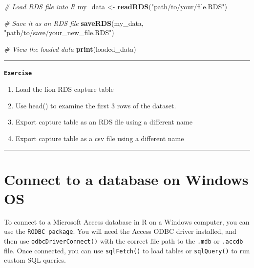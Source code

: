\documentclass[
]{book}
\newenvironment{Shaded}{\begin{snugshade}}{\end{snugshade}}
\newcommand{\CommentTok}[1]{\textcolor[rgb]{0.56,0.35,0.01}{\textit{#1}}}
\newcommand{\FunctionTok}[1]{\textcolor[rgb]{0.13,0.29,0.53}{\textbf{#1}}}
\newcommand{\NormalTok}[1]{#1}
\newcommand{\OtherTok}[1]{\textcolor[rgb]{0.56,0.35,0.01}{#1}}
\newcommand{\StringTok}[1]{\textcolor[rgb]{0.31,0.60,0.02}{#1}}
\providecommand{\tightlist}{%
  \setlength{\itemsep}{0pt}\setlength{\parskip}{0pt}}
\begin{document}
\begin{Shaded}
\begin{Highlighting}[]
\CommentTok{\# Load RDS file into R}
\NormalTok{my\_data }\OtherTok{\textless{}{-}} \FunctionTok{readRDS}\NormalTok{(}\StringTok{"path/to/your/file.RDS"}\NormalTok{)}

\CommentTok{\# Save it as an RDS file}
\FunctionTok{saveRDS}\NormalTok{(my\_data, }\StringTok{"path/to/save/your\_new\_file.RDS"}\NormalTok{)}

\CommentTok{\# View the loaded data}
\FunctionTok{print}\NormalTok{(loaded\_data)}
\end{Highlighting}
\end{Shaded}

\begin{center}\rule{0.5\linewidth}{0.5pt}\end{center}

\textbf{\texttt{Exercise}}

\begin{enumerate}
\def\labelenumi{\arabic{enumi}.}
\tightlist
\item
  Load the lion RDS capture table
\item
  Use head() to examine the first 3 rows of the dataset.
\item
  Export capture table as an RDS file using a different name
\item
  Export capture table as a csv file using a different name
\end{enumerate}

\begin{center}\rule{0.5\linewidth}{0.5pt}\end{center}

\section{Connect to a database on Windows OS}\label{connect-to-a-database-on-windows-os}

To connect to a Microsoft Access database in R on a Windows computer, you can use the \texttt{RODBC\ package}. You will need the Access ODBC driver installed, and then use \texttt{odbcDriverConnect()} with the correct file path to the \texttt{.mdb} or \texttt{.accdb} file. Once connected, you can use \texttt{sqlFetch()} to load tables or \texttt{sqlQuery()} to run custom SQL queries.
\end{document}

